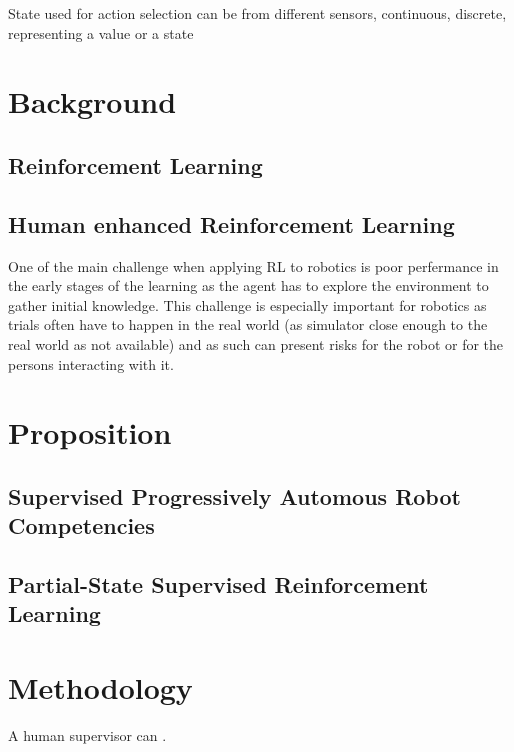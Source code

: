 \documentclass[letterpaper]{article} %
\begin{document}
State used for action selection can be from different sensors, continuous, discrete, representing a value or a state

\cite{kober2013reinforcement}

\section{Background}
\subsection{Reinforcement Learning}
\subsection{Human enhanced Reinforcement Learning}
One of the main challenge when applying RL to robotics is poor perfermance in
 the early stages of the learning as the agent has to explore the environment to
 gather initial knowledge. This challenge is especially
important for robotics as trials often have to happen in the real world (as
simulator close enough to the real world as not available) and as such can
present risks for the robot or for the persons interacting with it. 


\section{Proposition}
\subsection{Supervised Progressively Automous Robot Competencies}

\subsection{Partial-State Supervised Reinforcement Learning}

\section{Methodology}

A human supervisor can .
\end{document}

